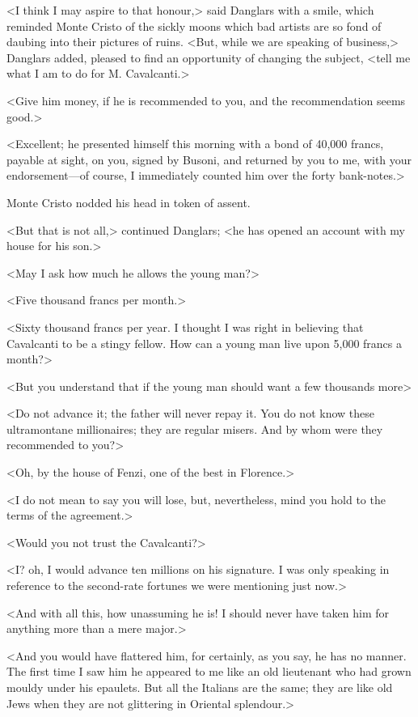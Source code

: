  <I think I may aspire to that honour,> said Danglars with a smile, which reminded Monte Cristo of the sickly moons which bad artists are so fond of daubing into their pictures of ruins. <But, while we are speaking of business,> Danglars added, pleased to find an opportunity of changing the subject, <tell me what I am to do for M. Cavalcanti.> 

 <Give him money, if he is recommended to you, and the recommendation seems good.> 

 <Excellent; he presented himself this morning with a bond of 40,000 francs, payable at sight, on you, signed by Busoni, and returned by you to me, with your endorsement—of course, I immediately counted him over the forty bank-notes.> 

 Monte Cristo nodded his head in token of assent. 

 <But that is not all,> continued Danglars; <he has opened an account with my house for his son.> 

 <May I ask how much he allows the young man?> 

 <Five thousand francs per month.> 

 <Sixty thousand francs per year. I thought I was right in believing that Cavalcanti to be a stingy fellow. How can a young man live upon 5,000 francs a month?> 

 <But you understand that if the young man should want a few thousands more\longdash> 

 <Do not advance it; the father will never repay it. You do not know these ultramontane millionaires; they are regular misers. And by whom were they recommended to you?> 

 <Oh, by the house of Fenzi, one of the best in Florence.> 

 <I do not mean to say you will lose, but, nevertheless, mind you hold to the terms of the agreement.> 

 <Would you not trust the Cavalcanti?> 

 <I? oh, I would advance ten millions on his signature. I was only speaking in reference to the second-rate fortunes we were mentioning just now.> 

 <And with all this, how unassuming he is! I should never have taken him for anything more than a mere major.> 

 <And you would have flattered him, for certainly, as you say, he has no manner. The first time I saw him he appeared to me like an old lieutenant who had grown mouldy under his epaulets. But all the Italians are the same; they are like old Jews when they are not glittering in Oriental splendour.> 

